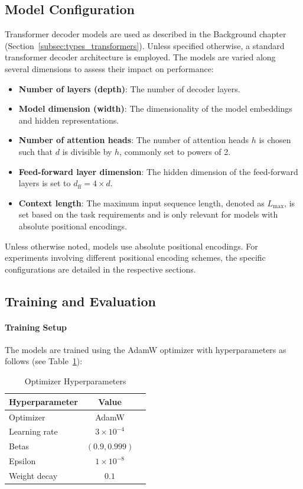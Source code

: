 \subsection{Model Configuration}

Transformer decoder models are used as described in the Background chapter (Section~\ref{subsec:types_transformers}). Unless specified otherwise, a standard transformer decoder architecture is employed. The models are varied along several dimensions to assess their impact on performance:

\begin{itemize}
    \item \textbf{Number of layers (depth)}: The number of decoder layers.
    \item \textbf{Model dimension (width)}: The dimensionality of the model embeddings and hidden representations.
    \item \textbf{Number of attention heads}: The number of attention heads $h$ is chosen such that $d$ is divisible by $h$, commonly set to powers of 2.
    \item \textbf{Feed-forward layer dimension}: The hidden dimension of the feed-forward layers is set to $d_{\text{ff}} = 4 \times d$.
    \item \textbf{Context length}: The maximum input sequence length, denoted as $L_{\text{max}}$, is set based on the task requirements and is only relevant for models with absolute positional encodings.
\end{itemize}

Unless otherwise noted, models use absolute positional encodings. For experiments involving different positional encoding schemes, the specific configurations are detailed in the respective sections.

\subsection{Training and Evaluation}

\paragraph{Training Setup}
The models are trained using the AdamW optimizer with hyperparameters as follows (see Table~\ref{tab:optimizer_hyperparameters}):

\begin{table}[h]
    \centering
    \caption{Optimizer Hyperparameters}
    \label{tab:optimizer_hyperparameters}
    \begin{tabular}{lcc}
        \toprule
        Hyperparameter & Value              \\
        \midrule
        Optimizer      & AdamW              \\
        Learning rate  & $3 \times 10^{-4}$ \\
        Betas          & $(0.9, 0.999)$     \\
        Epsilon        & $1 \times 10^{-8}$ \\
        Weight decay   & $0.1$              \\
        \bottomrule
    \end{tabular}
\end{table}

